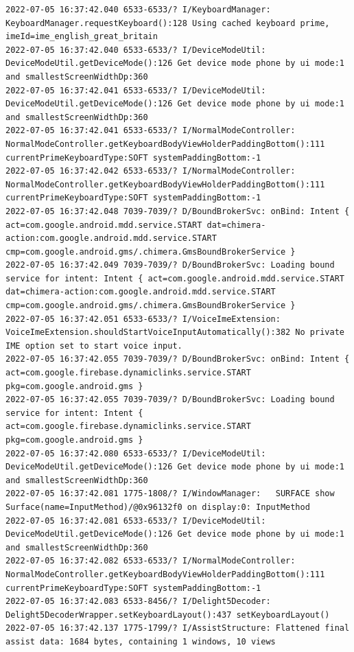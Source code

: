 \documentclass[a4paper,12pt]{book}
\begin{document}
\begin{lstlisting}
2022-07-05 16:37:42.040 6533-6533/? I/KeyboardManager: KeyboardManager.requestKeyboard():128 Using cached keyboard prime, imeId=ime_english_great_britain
2022-07-05 16:37:42.040 6533-6533/? I/DeviceModeUtil: DeviceModeUtil.getDeviceMode():126 Get device mode phone by ui mode:1 and smallestScreenWidthDp:360
2022-07-05 16:37:42.041 6533-6533/? I/DeviceModeUtil: DeviceModeUtil.getDeviceMode():126 Get device mode phone by ui mode:1 and smallestScreenWidthDp:360
2022-07-05 16:37:42.041 6533-6533/? I/NormalModeController: NormalModeController.getKeyboardBodyViewHolderPaddingBottom():111 currentPrimeKeyboardType:SOFT systemPaddingBottom:-1
2022-07-05 16:37:42.042 6533-6533/? I/NormalModeController: NormalModeController.getKeyboardBodyViewHolderPaddingBottom():111 currentPrimeKeyboardType:SOFT systemPaddingBottom:-1
2022-07-05 16:37:42.048 7039-7039/? D/BoundBrokerSvc: onBind: Intent { act=com.google.android.mdd.service.START dat=chimera-action:com.google.android.mdd.service.START cmp=com.google.android.gms/.chimera.GmsBoundBrokerService }
2022-07-05 16:37:42.049 7039-7039/? D/BoundBrokerSvc: Loading bound service for intent: Intent { act=com.google.android.mdd.service.START dat=chimera-action:com.google.android.mdd.service.START cmp=com.google.android.gms/.chimera.GmsBoundBrokerService }
2022-07-05 16:37:42.051 6533-6533/? I/VoiceImeExtension: VoiceImeExtension.shouldStartVoiceInputAutomatically():382 No private IME option set to start voice input.
2022-07-05 16:37:42.055 7039-7039/? D/BoundBrokerSvc: onBind: Intent { act=com.google.firebase.dynamiclinks.service.START pkg=com.google.android.gms }
2022-07-05 16:37:42.055 7039-7039/? D/BoundBrokerSvc: Loading bound service for intent: Intent { act=com.google.firebase.dynamiclinks.service.START pkg=com.google.android.gms }
2022-07-05 16:37:42.080 6533-6533/? I/DeviceModeUtil: DeviceModeUtil.getDeviceMode():126 Get device mode phone by ui mode:1 and smallestScreenWidthDp:360
2022-07-05 16:37:42.081 1775-1808/? I/WindowManager:   SURFACE show Surface(name=InputMethod)/@0x96132f0 on display:0: InputMethod
2022-07-05 16:37:42.081 6533-6533/? I/DeviceModeUtil: DeviceModeUtil.getDeviceMode():126 Get device mode phone by ui mode:1 and smallestScreenWidthDp:360
2022-07-05 16:37:42.082 6533-6533/? I/NormalModeController: NormalModeController.getKeyboardBodyViewHolderPaddingBottom():111 currentPrimeKeyboardType:SOFT systemPaddingBottom:-1
2022-07-05 16:37:42.083 6533-8456/? I/Delight5Decoder: Delight5DecoderWrapper.setKeyboardLayout():437 setKeyboardLayout()
2022-07-05 16:37:42.137 1775-1799/? I/AssistStructure: Flattened final assist data: 1684 bytes, containing 1 windows, 10 views

\end{lstlisting}
\end{document}
